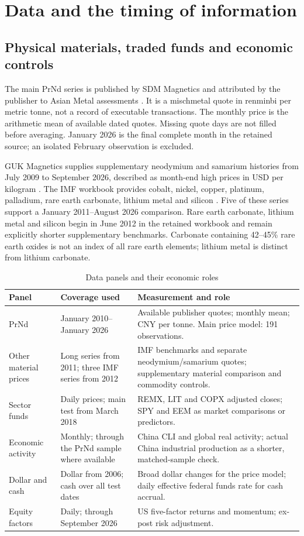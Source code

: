 \section{Data and the timing of information}
\subsection{Physical materials, traded funds and economic controls}

The main PrNd series is published by SDM Magnetics and attributed by the publisher to Asian Metal assessments \citep{sdm2026}. It is a mischmetal quote in renminbi per metric tonne, not a record of executable transactions. The monthly price is the arithmetic mean of available dated quotes. Missing quote days are not filled before averaging. January 2026 is the final complete month in the retained source; an isolated February observation is excluded.

GUK Magnetics supplies supplementary neodymium and samarium histories from July 2009 to September 2026, described as month-end high prices in USD per kilogram \citep{guk2026}. The IMF workbook provides cobalt, nickel, copper, platinum, palladium, rare earth carbonate, lithium metal and silicon \citep{imfdata,imfmethod}. Five of these series support a January 2011–August 2026 comparison. Rare earth carbonate, lithium metal and silicon begin in June 2012 in the retained workbook and remain explicitly shorter supplementary benchmarks. Carbonate containing 42–45\% rare earth oxides is not an index of all rare earth elements; lithium metal is distinct from lithium carbonate.

\begin{table}[!htbp]
\centering\small
\caption{Data panels and their economic roles}
\label{tab:data}
\begin{tabular}{@{}P{29mm}P{42mm}P{77mm}@{}}
\toprule
Panel & Coverage used & Measurement and role \\
\midrule
PrNd & January 2010–January 2026 & Available publisher quotes; monthly mean; CNY per tonne. Main price model: 191 observations. \\
Other material prices & Long series from 2011; three IMF series from 2012 & IMF benchmarks and separate neodymium/samarium quotes; supplementary material comparison and commodity controls. \\
Sector funds & Daily prices; main test from March 2018 & REMX, LIT and COPX adjusted closes; SPY and EEM as market comparisons or predictors. \\
Economic activity & Monthly; through the PrNd sample where available & China CLI and global real activity; actual China industrial production as a shorter, matched-sample check. \\
Dollar and cash & Dollar from 2006; cash over all test dates & Broad dollar changes for the price model; daily effective federal funds rate for cash accrual. \\
Equity factors & Daily; through September 2026 & US five-factor returns and momentum; ex-post risk adjustment. \\
\bottomrule
\end{tabular}
\end{table}

